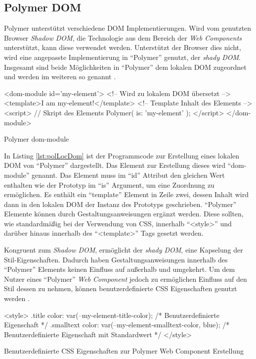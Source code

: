 \documentclass[12pt, paper=a4, bibtotoc, toc=listof, headsepline=true, numbers=endperiod]{scrreprt}
\begin{document}
\subsection{Polymer DOM}
Polymer unterstützt verschiedene \ac{DOM} Implementierungen. Wird vom genutzten Browser \emph{Shadow DOM}, die Technologie aus dem Bereich der \emph{Web Components} unterstützt, kann diese verwendet werden. Unterstützt der Browser dies nicht, wird eine angepasste Implementierung in \enquote{Polymer} genutzt, der \emph{shady DOM}. Insgesamt sind beide Möglichkeiten in \enquote{Polymer} dem lokalen \ac{DOM} zugeordnet und werden im weiteren so genannt \cite{polLocDom}.
\begin{listing}
	\begin{HTMLcode*}{}
<dom-module id='my-element'> <!-- Wird zu lokalem DOM übersetzt -->
   <template>I am my-element!</template>  <!-- Template Inhalt des Elements -->
   <script>  // Skript des Elements
      Polymer({
      is: 'my-element'
      });
   </script>
</dom-module>
	\end{HTMLcode*}
	\caption{Polymer dom-module}
	\label{lst:polLocDom}
\end{listing}\noindent
In Listing \ref{lst:polLocDom} ist der Programmcode zur Erstellung eines lokalen \ac{DOM} von \enquote{Polymer} dargestellt. Das Element zur Erstellung dieses wird \enquote{dom-module} genannt. Das Element muss im \enquote{id} Attribut den gleichen Wert enthalten wie der Prototyp im \enquote{is} Argument, um eine Zuordnung zu ermöglichen. Es enthält ein \enquote{template} Element in Zeile zwei, dessen Inhalt wird dann in den lokalen \ac{DOM} der Instanz des Prototyps geschrieben. \newline
\enquote{Polymer} Elemente können durch Gestaltungsanweisungen ergänzt werden. Diese sollten, wie standardmäßig bei der Verwendung von \ac{CSS}, innerhalb \enquote{<style>} und darüber hinaus innerhalb des \enquote{<template>} Tags gesetzt werden.

\newline
Kongruent zum \emph{Shadow DOM}, ermöglicht der \emph{shady DOM}, eine Kapselung der Stil-Eigenschaften. Dadurch haben Gestaltungsanweisungen innerhalb des \enquote{Polymer} Elements keinen Einfluss auf außerhalb und umgekehrt. Um dem Nutzer eines \enquote{Polymer} \emph{Web Component} jedoch zu ermöglichen Einfluss auf den Stil dessen zu nehmen, können benutzerdefinierte \ac{CSS} Eigenschaften genutzt werden \cite{polStyLocDom}.
\begin{listing}
	\begin{HTMLcode*}{}
<style>
.title {
	color: var(--my-element-title-color); /* Benutzerdefinierte Eigenschaft */
}
.smalltext {
	color: var(--my-element-smalltext-color, blue); /* Benutzerdefinierte Eigenschaft mit Standardwert */
}
</style>
	\end{HTMLcode*}
	\caption[Benutzerdefinierte CSS Eigenschaften]{Benutzerdefinierte CSS Eigenschaften zur Polymer Web Component Erstellung}
	\label{lst:benCss}
\end{listing}\noindent
\end{document}
